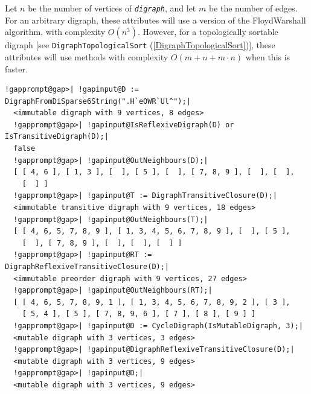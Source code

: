 \documentclass[a4paper,11pt]{report}
\begin{document}
{{{ Let $n$ be the number of vertices of \mbox{\texttt{\mdseries\slshape digraph}}, and let $m$ be the number of edges. For an arbitrary digraph, these attributes will use a
version of the Floyd\texttt{}Warshall algorithm, with complexity $O(n^3)$. However, for a topologically sortable digraph [see \texttt{DigraphTopologicalSort} (\ref{DigraphTopologicalSort})], these attributes will use methods with complexity $O(m + n + m \cdot n)$ when this is faster.

 
\begin{Verbatim}[commandchars=!@|,fontsize=\small,frame=single,label=Example]
  !gapprompt@gap>| !gapinput@D := DigraphFromDiSparse6String(".H`eOWR`Ul^");|
  <immutable digraph with 9 vertices, 8 edges>
  !gapprompt@gap>| !gapinput@IsReflexiveDigraph(D) or IsTransitiveDigraph(D);|
  false
  !gapprompt@gap>| !gapinput@OutNeighbours(D);|
  [ [ 4, 6 ], [ 1, 3 ], [  ], [ 5 ], [  ], [ 7, 8, 9 ], [  ], [  ], 
    [  ] ]
  !gapprompt@gap>| !gapinput@T := DigraphTransitiveClosure(D);|
  <immutable transitive digraph with 9 vertices, 18 edges>
  !gapprompt@gap>| !gapinput@OutNeighbours(T);|
  [ [ 4, 6, 5, 7, 8, 9 ], [ 1, 3, 4, 5, 6, 7, 8, 9 ], [  ], [ 5 ], 
    [  ], [ 7, 8, 9 ], [  ], [  ], [  ] ]
  !gapprompt@gap>| !gapinput@RT := DigraphReflexiveTransitiveClosure(D);|
  <immutable preorder digraph with 9 vertices, 27 edges>
  !gapprompt@gap>| !gapinput@OutNeighbours(RT);|
  [ [ 4, 6, 5, 7, 8, 9, 1 ], [ 1, 3, 4, 5, 6, 7, 8, 9, 2 ], [ 3 ], 
    [ 5, 4 ], [ 5 ], [ 7, 8, 9, 6 ], [ 7 ], [ 8 ], [ 9 ] ]
  !gapprompt@gap>| !gapinput@D := CycleDigraph(IsMutableDigraph, 3);|
  <mutable digraph with 3 vertices, 3 edges>
  !gapprompt@gap>| !gapinput@DigraphReflexiveTransitiveClosure(D);|
  <mutable digraph with 3 vertices, 9 edges>
  !gapprompt@gap>| !gapinput@D;|
  <mutable digraph with 3 vertices, 9 edges>
\end{Verbatim}
 }

 

}}
\end{document}
